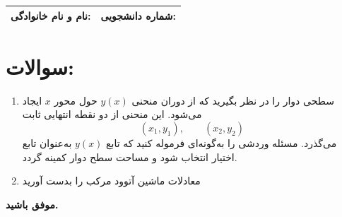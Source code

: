 \documentclass[12pt,a4paper]{article}
\begin{document}
	
	\begin{tabular}{|p{7cm}|p{7cm}|}
		\hline
		\textbf{نام و نام خانوادگی:} & \textbf{شماره دانشجویی:} \\
		\hline
	\end{tabular}
	
	\section*{سوالات:}
	
	\begin{enumerate}
		\item 
		سطحی دوار را در نظر بگیرید که از دوران منحنی \( y(x) \) حول محور \( x \)
		ایجاد می‌شود.  
		این منحنی از دو نقطه انتهایی ثابت
		\[
		(x_1, y_1), \qquad (x_2, y_2)
		\]
		می‌گذرد.
		مسئله وردشی را به‌گونه‌ای فرموله کنید که تابع \( y(x) \) به‌عنوان تابع
		اختیار انتخاب شود و مساحت سطح دوار کمینه گردد.
		\item
		معادلات ماشین آتوود مرکب را بدست آورید 
		
	\end{enumerate}
	
	\vspace{10pt}
	\textbf{موفق باشید.}
	
\end{document}
